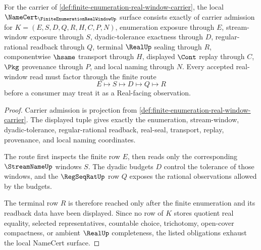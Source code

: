 \begin{theorem}
\label{thm:finite-enumeration-real-window-namecert-obligations}
For the carrier of \autoref{def:finite-enumeration-real-window-carrier}, the local $\NameCert_{\FiniteEnumerationRealWindowUp}$ surface consists exactly of carrier admission for $K=(E,S,D,Q,R,H,C,P,N)$, enumeration exposure through $E$, stream-window exposure through $S$, dyadic-tolerance exactness through $D$, regular-rational readback through $Q$, terminal $\RealUp$ sealing through $R$, componentwise $\hsame$ transport through $H$, displayed $\Cont$ replay through $C$, $\Pkg$ provenance through $P$, and local naming through $N$. Every accepted real-window read must factor through the finite route
$$
E \longmapsto S \longmapsto D \longmapsto Q \longmapsto R
$$
before a consumer may treat it as a Real-facing observation.
\end{theorem}
\begin{proof}
Carrier admission is projection from \autoref{def:finite-enumeration-real-window-carrier}. The displayed tuple gives exactly the enumeration, stream-window, dyadic-tolerance, regular-rational readback, real-seal, transport, replay, provenance, and local naming coordinates.

The route first inspects the finite row $E$, then reads only the corresponding $\StreamNameUp$ windows $S$. The dyadic budgets $D$ control the tolerance of those windows, and the $\RegSeqRatUp$ row $Q$ exposes the rational observations allowed by the budgets.

The terminal row $R$ is therefore reached only after the finite enumeration and its readback data have been displayed. Since no row of $K$ stores quotient real equality, selected representatives, countable choice, trichotomy, open-cover compactness, or ambient $\RealUp$ completeness, the listed obligations exhaust the local NameCert surface.
\end{proof}

